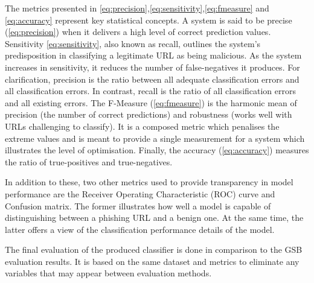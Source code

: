 The metrics presented in \ref{eq:precision},\ref{eq:sensitivity},\ref{eq:fmeasure} and \ref{eq:accuracy} represent key statistical concepts. A system is said to be precise (\ref{eq:precision}) when it delivers a high level of correct prediction values. Sensitivity \ref{eq:sensitivity}, also known as recall, outlines the system's predisposition in classifying a legitimate URL as being malicious. As the system increases in sensitivity, it reduces the number of false-negatives it produces. For clarification, precision is the ratio between all adequate classification errors and all classification errors. In contrast, recall is the ratio of all classification errors and all existing errors.
The F-Measure (\ref{eq:fmeasure}) is the harmonic mean of precision (the number of correct predictions) and robustness (works well with URLs challenging to classify). It is a composed metric which penalises the extreme values and is meant to provide a single measurement for a system which illustrates the level of optimisation. Finally, the accuracy (\ref{eq:accuracy}) measures the ratio of true-positives and true-negatives.

In addition to these, two other metrics used to provide transparency in model performance are the Receiver Operating Characteristic (ROC) curve and Confusion matrix. The former illustrates how well a model is capable of distinguishing between a phishing URL and a benign one. At the same time, the latter offers a view of the classification performance details of the model.

The final evaluation of the produced classifier is done in comparison to the GSB evaluation results. It is based on the same dataset and metrics to eliminate any variables that may appear between evaluation methods.
